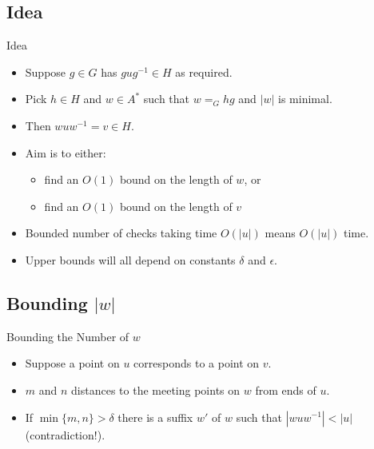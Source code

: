 \documentclass{article}
\begin{document}
\subsection{Idea}

\begin{frame}{Idea}
  \begin{itemize}
    \item Suppose $g \in G$ has $gug^{-1} \in H$ as required.
	\pause
	\item Pick $h \in H$ and $w \in A^*$ such that $w =_G hg$ and $|w|$ is minimal.
	\item Then $wuw^{-1} = v \in H$.
	\item Aim is to either:
	\pause
	\begin{itemize}
	  \item find an $O(1)$ bound on the length of $w$, or
	  \pause
	  \item find an $O(1)$ bound on the length of $v$
	\end{itemize}
	\pause
	\item Bounded number of checks taking time $O(|u|)$ means $O(|u|)$ time.
	\item Upper bounds will all depend on constants $\delta$ and $\epsilon$.
  \end{itemize}
\end{frame}

\subsection{Bounding $|w|$}

\begin{frame}{Bounding the Number of $w$}
  \begin{itemize}
    \item Suppose a point on $u$ corresponds to a point on $v$.
	\pause
	\item $m$ and $n$ distances to the meeting points on $w$ from ends of $u$.
	\begin{figure}
	
	\end{figure}
	\pause
	\item If $\min\{m,n\} > \delta$ there is a suffix $w'$ of $w$ such that $|wuw^{-1}| < |u|$ (contradiction!).
  \end{itemize}
\end{frame}
\end{document}
